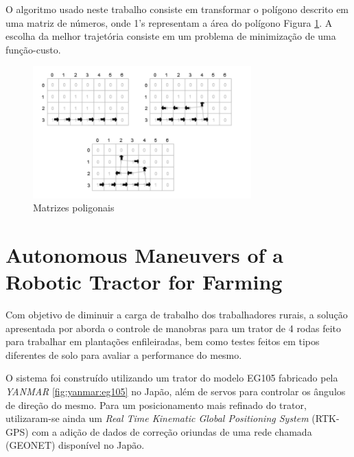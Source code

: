 O algoritmo usado neste trabalho consiste em transformar o polígono descrito em uma matriz de números, onde 1's representam a área do polígono Figura \ref{fig:matriz:poligono}. A escolha da melhor trajetória consiste em um problema de minimização de uma função-custo.
\begin{figure}[H]
    \centering
    \includegraphics[width=0.75\textwidth]{figuras/matrizesPoligno.png}
    \caption{Matrizes poligonais}
    \label{fig:matriz:poligono}
\end{figure}
\section{Autonomous Maneuvers of a Robotic Tractor for
Farming}

Com objetivo de diminuir a carga de trabalho dos trabalhadores rurais, a solução apresentada por \cite{Wang2016} aborda o controle de manobras para um trator de 4 rodas feito para trabalhar em plantações enfileiradas, bem como testes feitos em tipos diferentes de solo para avaliar a performance do mesmo.

O sistema foi construído utilizando um trator do modelo EG105 fabricado pela \textit{YANMAR} \ref{fig:yanmar:eg105} no Japão, além de servos para controlar os ângulos de direção do mesmo. Para um posicionamento mais refinado do trator, utilizaram-se ainda um \textit{Real Time Kinematic Global Positioning System} (RTK-GPS) com a adição de dados de correção oriundas de uma rede chamada (GEONET)  disponível no Japão. 

